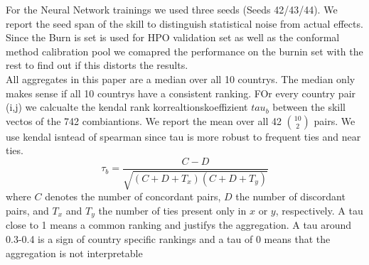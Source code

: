 For the Neural Network trainings we used three seeds (Seeds 42/43/44). We report the seed span of the skill to distinguish statistical noise from actual effects. \\
Since the Burn is set is used for HPO validation set as well as the conformal method calibration pool we comapred the performance on the burnin set with the rest to find out if this distorts the results. \\
All aggregates in this paper are a median over all 10 countrys. The median only makes sense if all 10 countrys have a consistent ranking. FOr every country pair (i,j) we calcualte the kendal rank korrealtionskoeffizient $tau_b$ between the skill vectos of the 742 combiantions. We report the mean over all 42 $\binom{10}{2}$ pairs. We use kendal isntead of spearman since tau is more robust to frequent ties and near ties.
\begin{equation}
\tau_b = \frac{C - D}{\sqrt{(C + D + T_x)(C + D + T_y)}}
\end{equation}
where $C$ denotes the number of concordant pairs, $D$ the number of discordant pairs, and $T_x$ and $T_y$ the number of ties present only in $x$ or $y$, respectively. A tau close to 1 means a common ranking and justifys the aggregation. A tau around 0.3-0.4 is a sign of country specific rankings and a tau of 0 means that the aggregation is not interpretable
